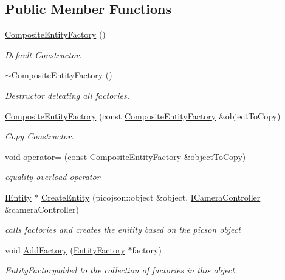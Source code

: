 \subsection*{Public Member Functions}
\begin{DoxyCompactItemize}
\item 
\mbox{\label{classCompositeEntityFactory_a703746f2b94fc98640de097afdbe1bc9}} 
\hyperlink{classCompositeEntityFactory_a703746f2b94fc98640de097afdbe1bc9}{Composite\+Entity\+Factory} ()
\begin{DoxyCompactList}\small\item\em Default Constructor. \end{DoxyCompactList}\item 
\mbox{\label{classCompositeEntityFactory_a62ec6ba774e3b397fc799c5e972dba45}} 
\hyperlink{classCompositeEntityFactory_a62ec6ba774e3b397fc799c5e972dba45}{$\sim$\+Composite\+Entity\+Factory} ()
\begin{DoxyCompactList}\small\item\em Destructor deleating all factories. \end{DoxyCompactList}\item 
\hyperlink{classCompositeEntityFactory_af70fe797d67a1526715369890b1fb136}{Composite\+Entity\+Factory} (const \hyperlink{classCompositeEntityFactory}{Composite\+Entity\+Factory} \&object\+To\+Copy)
\begin{DoxyCompactList}\small\item\em Copy Constructor. \end{DoxyCompactList}\item 
void \hyperlink{classCompositeEntityFactory_aa53621c622f2dbbf57dc8b3f698c1c59}{operator=} (const \hyperlink{classCompositeEntityFactory}{Composite\+Entity\+Factory} \&object\+To\+Copy)
\begin{DoxyCompactList}\small\item\em equality overload operator \end{DoxyCompactList}\item 
\hyperlink{classIEntity}{I\+Entity} $\ast$ \hyperlink{classCompositeEntityFactory_a97b2f95333369f946d0f3ab2116b5f19}{Create\+Entity} (picojson\+::object \&object, \hyperlink{classICameraController}{I\+Camera\+Controller} \&camera\+Controller)
\begin{DoxyCompactList}\small\item\em calls factories and creates the enitity based on the picson object \end{DoxyCompactList}\item 
void \hyperlink{classCompositeEntityFactory_a735c4e6bf789486468c4610f75688be2}{Add\+Factory} (\hyperlink{classEntityFactory}{Entity\+Factory} $\ast$factory)
\begin{DoxyCompactList}\small\item\em Entity\+Factoryadded to the collection of factories in this object. \end{DoxyCompactList}\end{DoxyCompactItemize}


